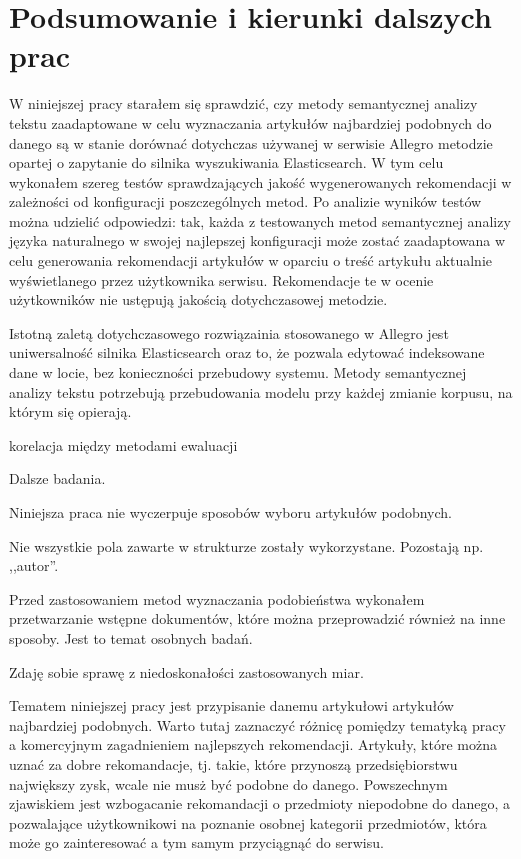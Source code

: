 \documentclass[pl]{minipw} %
\begin{document}

\chapter{Podsumowanie i kierunki dalszych prac}

W niniejszej pracy starałem się sprawdzić, czy metody semantycznej analizy tekstu zaadaptowane w celu wyznaczania artykułów najbardziej podobnych do danego są w stanie dorównać dotychczas używanej w serwisie Allegro metodzie opartej o zapytanie do silnika wyszukiwania Elasticsearch. W tym celu wykonałem szereg testów sprawdzających jakość wygenerowanych rekomendacji w zależności od konfiguracji poszczególnych metod. Po analizie wyników testów można udzielić odpowiedzi: tak, każda z testowanych metod semantycznej analizy języka naturalnego w swojej najlepszej konfiguracji może zostać zaadaptowana w celu generowania rekomendacji artykułów w oparciu o treść artykułu aktualnie wyświetlanego przez użytkownika serwisu. Rekomendacje te w ocenie  użytkowników nie ustępują jakością dotychczasowej metodzie. 


Istotną zaletą dotychczasowego rozwiązainia stosowanego w Allegro jest uniwersalność silnika Elasticsearch oraz to, że pozwala edytować indeksowane dane w locie, bez konieczności przebudowy systemu. Metody semantycznej analizy tekstu potrzebują przebudowania modelu przy każdej zmianie korpusu, na którym się opierają. 



korelacja między metodami ewaluacji

Dalsze badania.

Niniejsza praca nie wyczerpuje sposobów wyboru artykułów podobnych. 

Nie wszystkie pola zawarte w strukturze zostały wykorzystane. Pozostają np. ,,autor''.

Przed zastosowaniem metod wyznaczania podobieństwa wykonałem przetwarzanie wstępne dokumentów, które można przeprowadzić również na inne sposoby. Jest to temat osobnych badań.

Zdaję sobie sprawę z niedoskonałości zastosowanych miar.

Tematem niniejszej pracy jest przypisanie danemu artykułowi artykułów najbardziej podobnych. Warto tutaj zaznaczyć różnicę pomiędzy tematyką pracy a komercyjnym zagadnieniem najlepszych rekomendacji. Artykuły, które można uznać za dobre rekomandacje, tj. takie, które przynoszą przedsiębiorstwu największy zysk, wcale nie musż być podobne do danego. Powszechnym zjawiskiem jest wzbogacanie rekomandacji o przedmioty niepodobne do danego, a pozwalające użytkownikowi na poznanie osobnej kategorii przedmiotów, która może go zainteresować a tym samym przyciągnąć do serwisu.
\end{document}
